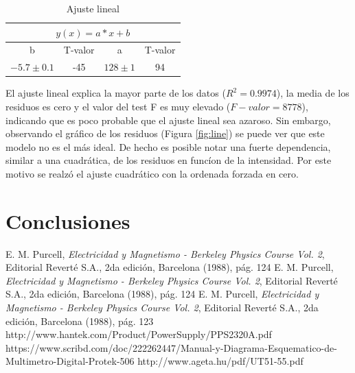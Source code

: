 \documentclass[twoside,twocolumn,a4paper]{article}
\begin{document}
\begin{table}[h]
\centering
\caption{Ajuste lineal}
\label{tab:line}
\begin{tabular}{|c|c|c|c|}
\hline
\multicolumn{4}{|c|}{$y(x)=a*x+b$}           \\ \hline
b            & T-valor & a         & T-valor \\ \hline
$-5.7\pm0.1$ & -45     & $128\pm1$ & 94      \\ \hline
\end{tabular}
\end{table}

El ajuste lineal explica la mayor parte de los datos ($R^2=0.9974$), la media de los residuos es cero y el valor del test F es muy elevado ($F-valor=8778$), indicando que es poco probable que el ajuste lineal sea azaroso. Sin embargo, observando el gr\'afico de los residuos (Figura \ref{fig:line}) se puede ver que este modelo no es el m\'as ideal. De hecho es posible notar una fuerte dependencia, similar a una cuadr\'atica, de los residuos en func\'ion de la intensidad. Por este motivo se realz\'o el ajuste cuadr\'atico con la ordenada forzada en cero.\par


\section{Conclusiones}



\begin{thebibliography}{99} %

 E. M. Purcell, \textit{Electricidad y Magnetismo - Berkeley Physics Course Vol. 2}, Editorial Revert\'e S.A., 2da edici\'on, Barcelona (1988), p\'ag. 124
 E. M. Purcell, \textit{Electricidad y Magnetismo - Berkeley Physics Course Vol. 2}, Editorial Revert\'e S.A., 2da edici\'on, Barcelona (1988), p\'ag. 124
 E. M. Purcell, \textit{Electricidad y Magnetismo - Berkeley Physics Course Vol. 2}, Editorial Revert\'e S.A., 2da edici\'on, Barcelona (1988), p\'ag. 123
 http://www.hantek.com/Product/PowerSupply/PPS2320A.pdf
 https://www.scribd.com/doc/222262447/Manual-y-Diagrama-Esquematico-de-Multimetro-Digital-Protek-506
 http://www.ageta.hu/pdf/UT51-55.pdf
 
\end{thebibliography}

\end{document}
